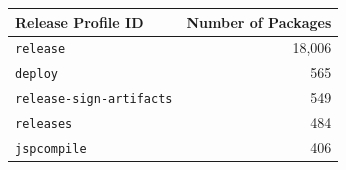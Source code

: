 \small
\begin{tabular}{@{}lr@{}}
    \toprule
    \textbf{Release Profile ID} & \textbf{Number of Packages} \\
    \midrule
    \texttt{release} & 18{,}006 \\
    \texttt{deploy} & 565 \\
    \texttt{release-sign-artifacts} & 549 \\
    \texttt{releases} & 484 \\
    \texttt{jspcompile} & 406 \\
    \bottomrule
\end{tabular}
